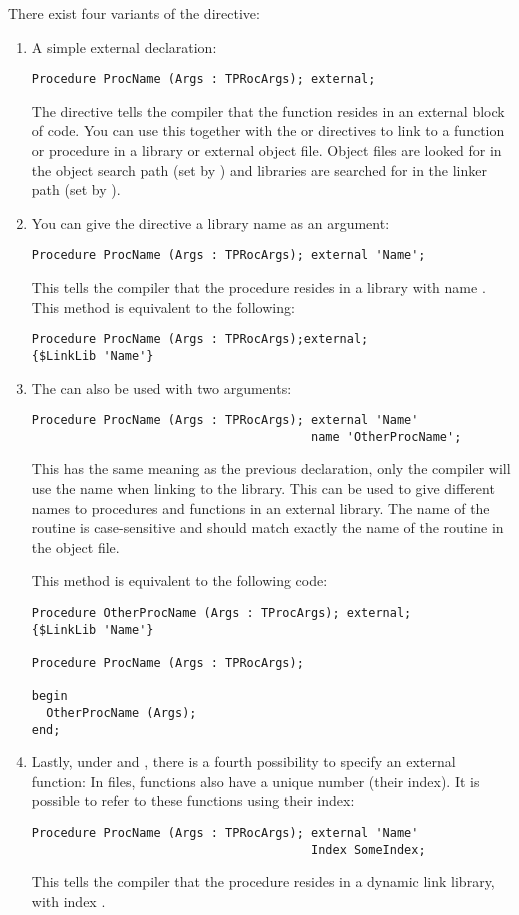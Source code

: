 There exist four variants of the  directive:
\begin{enumerate}
\item A simple external declaration:
\begin{verbatim}
Procedure ProcName (Args : TPRocArgs); external;
\end{verbatim}
The  directive tells the compiler that the function resides in
an external block of code. You can use this together with the 
or  directives to link to a function or procedure in a
library or external object file. Object files are looked for in the object
search path (set by ) and libraries are searched for in the linker
path (set by ).

\item You can give the  directive a library name as an
argument:
\begin{verbatim}
Procedure ProcName (Args : TPRocArgs); external 'Name';
\end{verbatim}
This tells the compiler that the procedure resides in a library with name
. This method is equivalent to the following:
\begin{verbatim}
Procedure ProcName (Args : TPRocArgs);external;
{$LinkLib 'Name'}
\end{verbatim}
\item The  can also be used with two arguments:
\begin{verbatim}
Procedure ProcName (Args : TPRocArgs); external 'Name'
                                       name 'OtherProcName';
\end{verbatim}
This has the same meaning as the previous declaration, only the compiler
will use the name  when linking to the library. This
can be used to give different names to procedures and functions in an
external library. The name of the routine is case-sensitive and should
match exactly the name of the routine in the object file.

This method is equivalent to the following code:
\begin{verbatim}
Procedure OtherProcName (Args : TProcArgs); external;
{$LinkLib 'Name'}

Procedure ProcName (Args : TPRocArgs);

begin
  OtherProcName (Args);
end;
\end{verbatim}
\item Lastly, under \windows and \ostwo, there is a fourth possibility
to specify an external function: In  files, functions also have
a unique number (their index). It is possible to refer to these functions
using their index:
\begin{verbatim}
Procedure ProcName (Args : TPRocArgs); external 'Name' 
                                       Index SomeIndex;
\end{verbatim}
This tells the compiler that the procedure  resides in a
dynamic link library, with index .


\end{enumerate}
